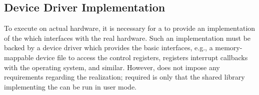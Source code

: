\subsection{Device Driver Implementation}\label{sec:pi-dd}%
To execute on actual hardware, it is necessary for a  to provide an implementation of the  which interfaces with the real hardware.
Such an implementation must be backed by a device driver which provides the basic interfaces, e.g., a memory-mappable device file to access the control registers, registers interrupt callbacks with the operating system, and similar.
However, \tpc{} does not impose any requirements regarding the realization; required is only that the shared library implementing the  can be run in user mode.
